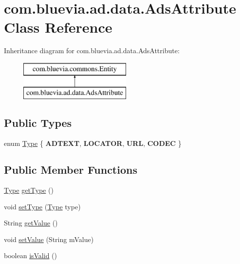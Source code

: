 \hypertarget{classcom_1_1bluevia_1_1ad_1_1data_1_1AdsAttribute}{
\section{com.bluevia.ad.data.AdsAttribute Class Reference}
\label{classcom_1_1bluevia_1_1ad_1_1data_1_1AdsAttribute}
}
Inheritance diagram for com.bluevia.ad.data.AdsAttribute:\begin{figure}[H]
\begin{center}
\leavevmode
\includegraphics[height=2.000000cm]{classcom_1_1bluevia_1_1ad_1_1data_1_1AdsAttribute}
\end{center}
\end{figure}
\subsection*{Public Types}
\begin{DoxyCompactItemize}
\item 
enum \hyperlink{classcom_1_1bluevia_1_1ad_1_1data_1_1AdsAttribute_a91897d047ee70ae0e123b6adc73973cc}{Type} \{ {\bfseries ADTEXT}, 
{\bfseries LOCATOR}, 
{\bfseries URL}, 
{\bfseries CODEC}
 \}
\end{DoxyCompactItemize}
\subsection*{Public Member Functions}
\begin{DoxyCompactItemize}
\item 
\hyperlink{classcom_1_1bluevia_1_1ad_1_1data_1_1AdsAttribute_a91897d047ee70ae0e123b6adc73973cc}{Type} \hyperlink{classcom_1_1bluevia_1_1ad_1_1data_1_1AdsAttribute_a813841993f26179769b15f2d80d09b61}{getType} ()
\item 
void \hyperlink{classcom_1_1bluevia_1_1ad_1_1data_1_1AdsAttribute_a647756d0a814193b9d847f1050c4f9ba}{setType} (\hyperlink{classcom_1_1bluevia_1_1ad_1_1data_1_1AdsAttribute_a91897d047ee70ae0e123b6adc73973cc}{Type} type)
\item 
String \hyperlink{classcom_1_1bluevia_1_1ad_1_1data_1_1AdsAttribute_acefb4aa19ac588f2c0b4496ffa7dddcf}{getValue} ()
\item 
void \hyperlink{classcom_1_1bluevia_1_1ad_1_1data_1_1AdsAttribute_a290f3ef6f06ac18f6cd084863fc4a7d6}{setValue} (String mValue)
\item 
boolean \hyperlink{classcom_1_1bluevia_1_1ad_1_1data_1_1AdsAttribute_adda7ab450d108a61cea41f5e58b07f15}{isValid} ()
\end{DoxyCompactItemize}


